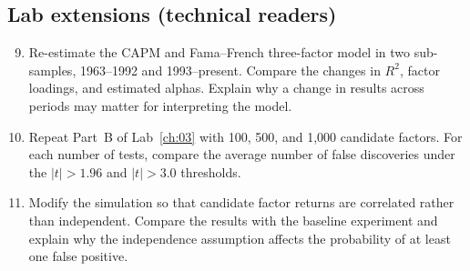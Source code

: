 \subsection*{Lab extensions (technical readers)}
\begin{enumerate}
  \setcounter{enumi}{8}
  \item Re-estimate the CAPM and Fama--French three-factor model in two sub-samples, 1963--1992 and 1993--present. Compare the changes in $R^2$, factor loadings, and estimated alphas. Explain why a change in results across periods may matter for interpreting the model.
  \item Repeat Part~B of Lab~\ref{ch:03} with 100, 500, and 1,000 candidate factors. For each number of tests, compare the average number of false discoveries under the $|t|>1.96$ and $|t|>3.0$ thresholds.
  \item Modify the simulation so that candidate factor returns are correlated rather than independent. Compare the results with the baseline experiment and explain why the independence assumption affects the probability of at least one false positive.
\end{enumerate}

